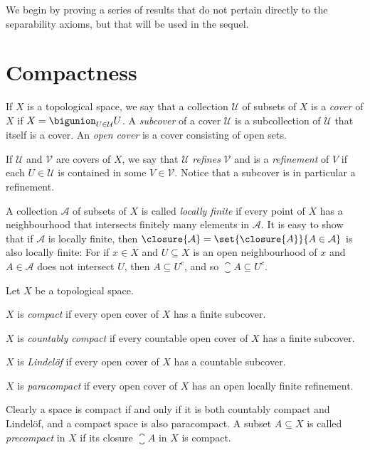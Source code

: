 \documentclass[article, a4paper, 11pt, oneside]{memoir}
\numberwithin{equation}{chapter}
\newcommand{\calU}{\mathcal{U}}
\newcommand{\calV}{\mathcal{V}}
\begin{document}
We begin by proving a series of results that do not pertain directly to the separability axioms, but that will be used in the sequel.


\section{Compactness}

\newcommand{\calA}{\mathcal{A}}

If $X$ is a topological space, we say that a collection $\calU$ of subsets of $X$ is a \emph{cover} of $X$ if $X = \bigunion_{U \in \calU} U$. A \emph{subcover} of a cover $\calU$ is a subcollection of $\calU$ that itself is a cover. An \emph{open cover} is a cover consisting of open sets.

If $\calU$ and $\calV$ are covers of $X$, we say that $\calU$ \emph{refines} $\calV$ and is a \emph{refinement} of $V$ if each $U \in \calU$ is contained in some $V \in \calV$. Notice that a subcover is in particular a refinement.

A collection $\calA$ of subsets of $X$ is called \emph{locally finite} if every point of $X$ has a neighbourhood that intersects finitely many elements in $\calA$. It is easy to show that if $\calA$ is locally finite, then $\closure{\calA} = \set{\closure{A}}{A \in \calA}$ is also locally finite: For if $x \in X$ and $U \subseteq X$ is an open neighbourhood of $x$ and $A \in \calA$ does not intersect $U$, then $A \subseteq U^c$, and so $\closure{A} \subseteq U^c$.

\begin{definition}
    Let $X$ be a topological space.
    \begin{enumdef}
        \item $X$ is \emph{compact} if every open cover of $X$ has a finite subcover.
        
        \item $X$ is \emph{countably compact} if every countable open cover of $X$ has a finite subcover.

        \item $X$ is \emph{Lindelöf} if every open cover of $X$ has a countable subcover.

        \item $X$ is \emph{paracompact} if every open cover of $X$ has an open locally finite refinement.
    \end{enumdef}
\end{definition}
%
Clearly a space is compact if and only if it is both countably compact and Lindelöf, and a compact space is also paracompact. A subset $A \subseteq X$ is called \emph{precompact} in $X$ if its closure $\closure{A}$ in $X$ is compact.
\end{document}
